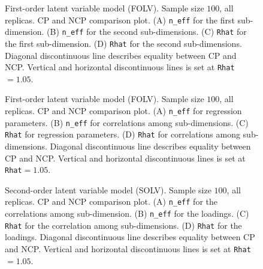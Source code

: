 %
\begin{figure}[h]
	\centering
	\begin{subfigure}
		\texttt{[image: FOLV\_100\_neff3]}
	\end{subfigure}
	\begin{subfigure}
		\texttt{[image: FOLV\_100\_Rhat3]}
	\end{subfigure}
	\caption[First-order latent variable model (FOLV). Sample size $100$, all replicas. CP and NCP comparison plot.]%
	{First-order latent variable model (FOLV). Sample size $100$, all replicas. CP and NCP comparison plot. (A) \texttt{n\_eff} for the first sub-dimension. (B) \texttt{n\_eff} for the second sub-dimensions. (C) \texttt{Rhat} for the first sub-dimension. (D) \texttt{Rhat} for the second sub-dimensions. Diagonal discontinuous line describes equality between CP and NCP. Vertical and horizontal discontinuous lines is set at \texttt{Rhat}$=1.05$. }
	\label{fig:FOLV_stat3}
\end{figure}
%
\begin{figure}[h]
	\centering
	\begin{subfigure}
		\texttt{[image: FOLV\_100\_neff2]}
	\end{subfigure}
	\begin{subfigure}
		\texttt{[image: FOLV\_100\_Rhat2]}
	\end{subfigure}
	\caption[First-order latent variable model (FOLV). Sample size $100$, all replicas. CP and NCP comparison plot.]%
	{First-order latent variable model (FOLV). Sample size $100$, all replicas. CP and NCP comparison plot. (A) \texttt{n\_eff} for regression parameters. (B) \texttt{n\_eff} for correlations among sub-dimensions. (C) \texttt{Rhat} for regression parameters. (D) \texttt{Rhat} for correlations among sub-dimensions. Diagonal discontinuous line describes equality between CP and NCP. Vertical and horizontal discontinuous lines is set at \texttt{Rhat}$=1.05$. }
	\label{fig:FOLV_stat2}
\end{figure}
%
\begin{figure}[h]
	\centering
	\begin{subfigure}
		\texttt{[image: SOLV\_100\_neff3]}
	\end{subfigure}
	\begin{subfigure}
		\texttt{[image: SOLV\_100\_Rhat3]}
	\end{subfigure}
	\caption[Second-order latent variable model (SOLV). Sample size $100$, all replicas. CP and NCP comparison plot.]%
	{Second-order latent variable model (SOLV). Sample size $100$, all replicas. CP and NCP comparison plot. (A) \texttt{n\_eff} for the correlations among sub-dimension. (B) \texttt{n\_eff} for the loadings. (C) \texttt{Rhat} for the correlation among sub-dimensions. (D) \texttt{Rhat} for the loadings. Diagonal discontinuous line describes equality between CP and NCP. Vertical and horizontal discontinuous lines is set at \texttt{Rhat}$=1.05$. }
	\label{fig:SOLV_stat1}
\end{figure}
